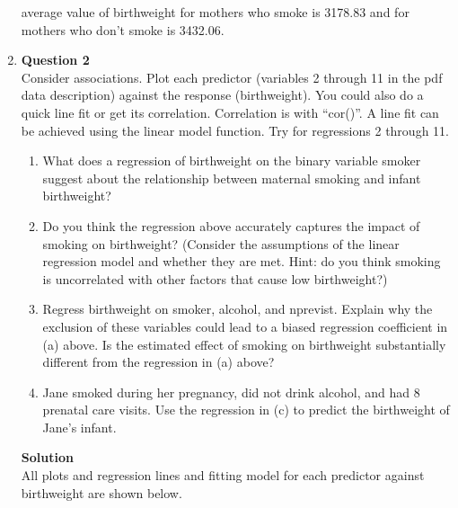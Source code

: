 \documentclass{uofa-eng-assignment}
\begin{document}
\begin{enumerate}
        average value of birthweight
        for mothers who smoke is 3178.83 and for mothers who don't smoke is 3432.06. \\
    \item[] \textbf{Question 2} \\
        Consider associations. Plot each predictor (variables 2 through 11 in the pdf data description)
        against the response (birthweight). You could also do a quick line fit or get its correlation.
        Correlation is with “cor()”. A line fit can be achieved using the linear model function.
        Try for regressions 2 through 11.
        \begin{enumerate}
            \item What does a regression of birthweight on the binary variable smoker suggest
                  about the relationship between maternal smoking and infant birthweight?
            \item Do you think the regression above accurately captures the impact of smoking on
                  birthweight? (Consider the assumptions of the linear regression model and
                  whether they are met. Hint: do you think smoking is uncorrelated with other
                  factors that cause low birthweight?)
            \item Regress birthweight on smoker, alcohol, and nprevist. Explain why the exclusion
                  of these variables could lead to a biased regression coefficient in (a) above.
                  Is the estimated effect of smoking on birthweight substantially different from
                  the regression in (a) above?
            \item Jane smoked during her pregnancy, did not drink alcohol, and had 8 prenatal
                  care visits. Use the regression in (c) to predict the birthweight of Jane’s
                  infant.
        \end{enumerate}
        \textbf{Solution} \\
        All plots and regression lines and fitting model for each predictor against birthweight are shown below.


\end{enumerate}
\end{document}
